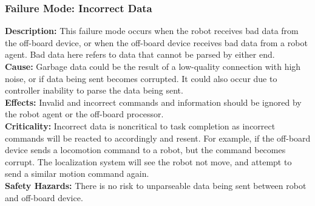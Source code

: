\subsubsection{Failure Mode: Incorrect Data}
\label{sec:comm_fm_incorrect}
\textbf{Description:} This failure mode occurs when the robot receives bad data from the off-board device, or when the off-board device receives bad data from a robot agent. Bad data here refers to data that cannot be parsed by either end. \\
\textbf{Cause:} Garbage data could be the result of a low-quality connection with high noise, or if data being sent becomes corrupted. It could also occur due to controller inability to parse the data being sent. \\
\textbf{Effects:} Invalid and incorrect commands and information should be ignored by the robot agent or the off-board processor. \\
\textbf{Criticality:} Incorrect data is noncritical to task completion as incorrect commands will be reacted to accordingly and resent. For example, if the off-board device sends a locomotion command to a robot, but the command becomes corrupt. The localization system will see the robot not move, and attempt to send a similar motion command again. \\
\textbf{Safety Hazards:} There is no risk to unparseable data being sent between robot and off-board device. \\
